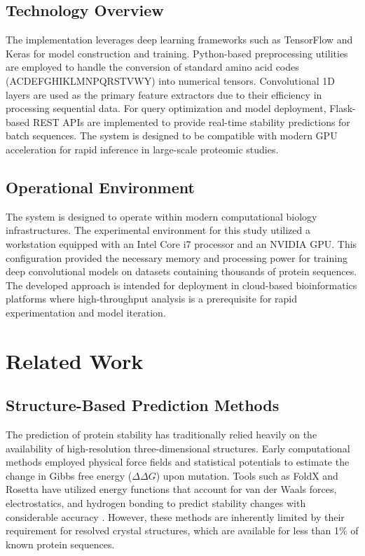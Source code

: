 \documentclass[conference]{IEEEtran}
\begin{document}
\subsection{Technology Overview}
The implementation leverages deep learning frameworks such as TensorFlow and Keras for model construction and training. Python-based preprocessing utilities are employed to handle the conversion of standard amino acid codes (ACDEFGHIKLMNPQRSTVWY) into numerical tensors. Convolutional 1D layers are used as the primary feature extractors due to their efficiency in processing sequential data. For query optimization and model deployment, Flask-based REST APIs are implemented to provide real-time stability predictions for batch sequences. The system is designed to be compatible with modern GPU acceleration for rapid inference in large-scale proteomic studies.

\subsection{Operational Environment}
The system is designed to operate within modern computational biology infrastructures. The experimental environment for this study utilized a workstation equipped with an Intel Core i7 processor and an NVIDIA GPU. This configuration provided the necessary memory and processing power for training deep convolutional models on datasets containing thousands of protein sequences. The developed approach is intended for deployment in cloud-based bioinformatics platforms where high-throughput analysis is a prerequisite for rapid experimentation and model iteration.

\section{Related Work}
\subsection{Structure-Based Prediction Methods}
The prediction of protein stability has traditionally relied heavily on the availability of high-resolution three-dimensional structures. Early computational methods employed physical force fields and statistical potentials to estimate the change in Gibbs free energy ($\Delta\Delta G$) upon mutation. Tools such as FoldX and Rosetta have utilized energy functions that account for van der Waals forces, electrostatics, and hydrogen bonding to predict stability changes with considerable accuracy \cite{b12}. However, these methods are inherently limited by their requirement for resolved crystal structures, which are available for less than 1\% of known protein sequences.
\end{document}
